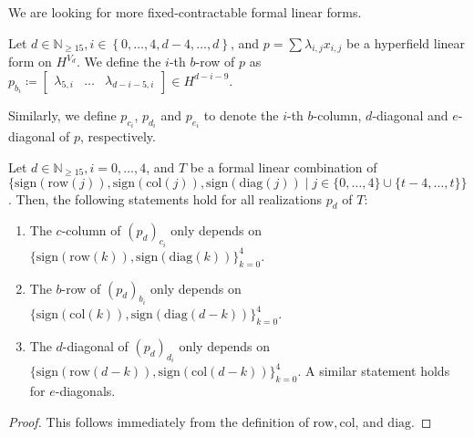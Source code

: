 We are looking for more fixed-contractable formal linear forms.

\begin{definition}
    Let \( d \in \mathbb{N}_{\geq 15} , i \in \left\{ 0,\dots,4,d-4, \dots, d \right\}\), and $p = \sum \lambda_{i,j} x_{i,j}$ be a hyperfield linear form on \( H^{V_d} \). We define the $i$-th $b$-row of $p$ as \( p_{b_{i}} \coloneqq \begin{bmatrix} \lambda_{5,i} & \dots & \lambda_{d-i-5,i} \end{bmatrix} \in H^{d -  i - 9} \).
  
   Similarly, we define $p_{c_{i}}$, $p_{d_{i}}$ and $p_{e_{i}}$ to denote the $i$-th $b$-column, $d$-diagonal and $e$-diagonal of $p$, respectively.
  \end{definition}


\begin{proposition}\label{prop:nwfiewnfiuwneufni2un2}
    Let \( d \in \mathbb{N}_{\geq 15} , i  = 0, \dots, 4\), and $T$ be a formal linear combination of \(  \{ \mathrm{sign}(\mathrm{row}(j)), \mathrm{sign}(\mathrm{col}(j)), \mathrm{sign}(\mathrm{diag}(j)) \mid j \in \{ 0, \dots, 4\} \cup \{ t-4, \dots, t \} \} \).
Then, the following statements hold for all realizations \( p_d \) of \( T \):
  \begin{enumerate}
  \item The $c$-column of $(p_d)_{c_i}$ only depends on $\{ \mathrm{sign}(\mathrm{row}(k)), \mathrm{sign}(\mathrm{diag}(k)) \}_{k = 0}^4$.
  \item The $b$-row of $(p_d)_{b_i}$ only depends on $\{ \mathrm{sign}(\mathrm{col}(k)), \mathrm{sign}(\mathrm{diag}(d-k)) \}_{k = 0}^4$.
  \item The $d$-diagonal of $(p_d)_{d_i}$ only depends on \(\{ \mathrm{sign}(\mathrm{row}(d-k)), \mathrm{sign}(\mathrm{col}(d-k)) \}_{k = 0}^4 \). A similar statement holds for $e$-diagonals.
  \end{enumerate}
  \end{proposition}
  
  \begin{proof}
   This follows immediately from the definition of $\mathrm{row}, \mathrm{col}$, and $\mathrm{diag}$.
  \end{proof}

